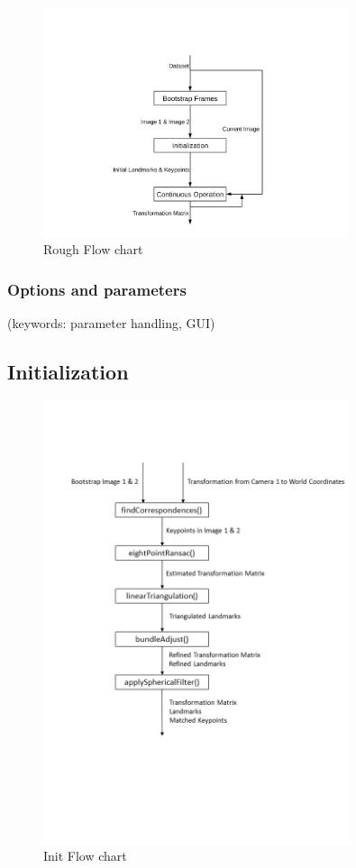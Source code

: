 \documentclass[a4paper,10pt]{article} %
\begin{document}
\begin{figure}[ht]
	\includegraphics[width=0.8\textwidth]{rough_flow}
	\caption{Rough Flow chart}
	\label{img_flow_rough}
\end{figure}
%
\subsubsection{Options and parameters}
(keywords: parameter handling, GUI)



\subsection{Initialization}
\label{sec_init}


\begin{figure}[ht]
	\includegraphics[width=0.8\textwidth]{init_chart}
	\caption{Init Flow chart}
	\label{img_flow_init}
\end{figure}
\end{document}
